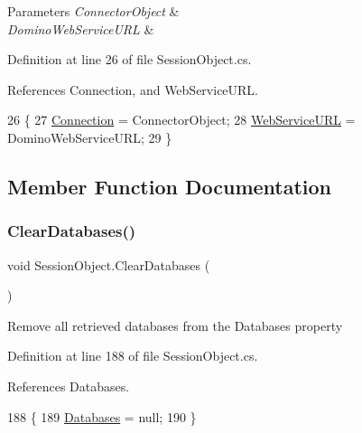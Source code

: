 \begin{DoxyParams}{Parameters}
{\em Connector\+Object} & \\
\hline
{\em Domino\+Web\+Service\+U\+RL} & \\
\hline
\end{DoxyParams}


Definition at line 26 of file Session\+Object.\+cs.



References Connection, and Web\+Service\+U\+RL.


\begin{DoxyCode}
26                                                                                 \{
27         \mbox{\hyperlink{class_session_object_a014bdbf705a753540e19bfb53030c55c}{Connection}} = ConnectorObject;
28         \mbox{\hyperlink{class_session_object_a697c071c812fbf7ad1166b896fb44c16}{WebServiceURL}} = DominoWebServiceURL;
29     \}
\end{DoxyCode}


\subsection{Member Function Documentation}
\mbox{\label{class_session_object_a7a13510147dc63acd76f3015b6f8e409}} 
\subsubsection{\texorpdfstring{Clear\+Databases()}{ClearDatabases()}}
{\footnotesize\ttfamily void Session\+Object.\+Clear\+Databases (\begin{DoxyParamCaption}{ }\end{DoxyParamCaption})}



Remove all retrieved databases from the \textquotesingle{}Databases\textquotesingle{} property 



Definition at line 188 of file Session\+Object.\+cs.



References Databases.


\begin{DoxyCode}
188                                  \{
189         \mbox{\hyperlink{class_session_object_aa0b75f5b9d0a6325f436e08db27204a2}{Databases}} = null;
190     \}
\end{DoxyCode}
\mbox{\label{class_session_object_ae1dc8cf45f981c629d0f77fbff04ae66}} 
